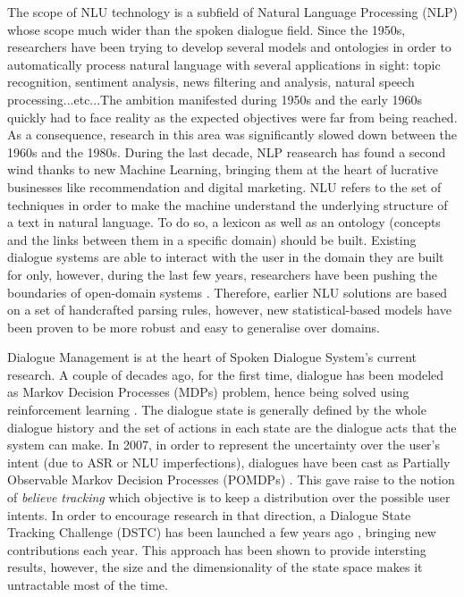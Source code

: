             The scope of NLU technology is a subfield of Natural Language Processing (NLP) whose scope much wider than the spoken dialogue field. Since the 1950s, researchers have been trying to develop several models and ontologies in order to automatically process natural language with several applications in sight: topic recognition, sentiment analysis, news filtering and analysis, natural speech processing...etc...The ambition manifested during 1950s and the early 1960s quickly had to face reality as the expected objectives were far from being reached. As a consequence, research in this area was significantly slowed down between the 1960s and the 1980s. During the last decade, NLP reasearch has found a second wind thanks to new Machine Learning, bringing them at the heart of lucrative businesses like recommendation and digital marketing. NLU refers to the set of techniques in order to make the machine understand the underlying structure of a text in natural language. To do so, a lexicon as well as an ontology (concepts and the links between them in a specific domain) should be built. Existing dialogue systems are able to interact with the user in the domain they are built for only, however, during the last few years, researchers have been pushing the boundaries of open-domain systems \cite{Gasic2013}. Therefore, earlier NLU solutions are based on a set of handcrafted parsing rules, however, new statistical-based models have been proven to be more robust and easy to generalise over domains.

            Dialogue Management is at the heart of Spoken Dialogue System's current research. A couple of decades ago, for the first time, dialogue has been modeled as Markov Decision Processes (MDPs) problem, hence being solved using reinforcement learning \cite{Eckert1997}. The dialogue state is generally defined by the whole dialogue history and the set of actions in each state are the dialogue acts that the system can make. In 2007, in order to represent the uncertainty over the user's intent (due to ASR or NLU imperfections), dialogues have been cast as Partially Observable Markov Decision Processes (POMDPs) \cite{Williams2007}. This gave raise to the notion of \textit{believe tracking} which objective is to keep a distribution over the possible user intents. In order to encourage research in that direction, a Dialogue State Tracking Challenge (DSTC) has been launched a few years ago \cite{Williams2012b}, bringing new contributions each year. This approach has been shown to provide intersting results, however, the size and the dimensionality of the state space makes it untractable most of the time.

